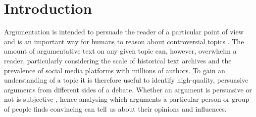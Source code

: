 \section{Introduction}\label{sec:intro}



Argumentation is intended to persuade the reader of a particular point of view and 
is an important way for humans to reason about controversial topics \cite{mercier2011humans}. 
The amount of argumentative text on any given topic can, however, overwhelm a reader, particularly
considering the scale of historical text archives 
and the prevalence of social media platforms with millions of authors.
To gain an understanding of a topic it is therefore useful to identify high-quality, 
persuasive arguments from different sides of a debate. 
Whether an argument is persuasive or not is subjective \cite{lukin2017argument},
hence analysing which arguments a particular person or group of people finds convincing can tell us
about their opinions and influences.

